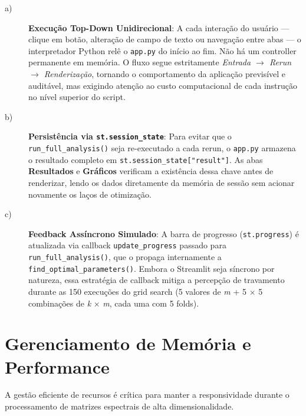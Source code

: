 \begin{description}

\item[a)] \textbf{Execução Top-Down Unidirecional}: A cada interação do usuário — clique
em botão, alteração de campo de texto ou navegação entre abas — o interpretador Python
relê o \texttt{app.py} do início ao fim. Não há um controller permanente em memória.
O fluxo segue estritamente \textit{Entrada $\rightarrow$ Rerun $\rightarrow$ Renderização},
tornando o comportamento da aplicação previsível e auditável, mas exigindo atenção ao
custo computacional de cada instrução no nível superior do script.

\item[b)] \textbf{Persistência via \texttt{st.session\_state}}: Para evitar que o
\texttt{run\_full\_analysis()} seja re-executado a cada rerun, o \texttt{app.py}
armazena o resultado completo em \texttt{st.session\_state["result"]}. As abas  %
\textbf{Resultados} e \textbf{Gráficos} verificam a existência dessa chave antes de
renderizar, lendo os dados diretamente da memória de sessão sem acionar novamente os
laços de otimização.

\item[c)] \textbf{Feedback Assíncrono Simulado}: A barra de progresso
(\texttt{st.progress}) é atualizada via callback \texttt{update\_progress} passado para
\texttt{run\_full\_analysis()}, que o propaga internamente a
\texttt{find\_optimal\_parameters()}. Embora o Streamlit seja síncrono por natureza, essa
estratégia de callback mitiga a percepção de travamento durante as 150 execuções do grid
search (5 valores de \textit{m} + 5 $\times$ 5 combinações de \textit{k} $\times$
\textit{m}, cada uma com 5 folds).

\end{description}

\section{Gerenciamento de Memória e Performance}

A gestão eficiente de recursos é crítica para manter a responsividade durante o
processamento de matrizes espectrais de alta dimensionalidade.

